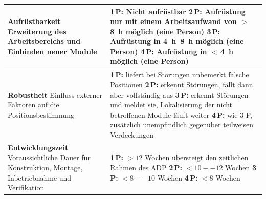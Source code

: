 {\begin{xltabular}{\textwidth}{>{\raggedright\arraybackslash}p{5.4cm}
                              >{\raggedright\arraybackslash}X}
    \midrule
    \textbf{Aufrüstbarkeit}\newline
    Erweiterung des Arbeitsbereichs und Einbinden neuer Module
    & \textbf{1\,P:} Nicht aufrüstbar\newline
      \textbf{2\,P:} Aufrüstung nur mit einem Arbeitsaufwand von $>$\,\SI{8}{\hour} möglich (eine Person)\newline
      \textbf{3\,P:} Aufrüstung in \SIrange{4}{8}{\hour} möglich (eine Person)\newline
      \textbf{4\,P:} Aufrüstung in $<$\,\SI{4}{\hour} möglich (eine Person) \\
    \midrule
    \textbf{Robustheit}\newline
    Einfluss externer Faktoren auf die Positionsbestimmung
    & \textbf{1\,P:} liefert bei Störungen unbemerkt falsche Positionen\newline
      \textbf{2\,P:} erkennt Störungen, fällt dann aber vollständig aus\newline
      \textbf{3\,P:} erkennt Störungen und meldet sie, Lokalisierung der nicht betroffenen Module läuft weiter\newline
      \textbf{4\,P:} wie 3 P, zusätzlich unempfindlich gegenüber teilweisen Verdeckungen \\
    \midrule
    \textbf{Entwicklungszeit}\newline
    Voraussichtliche Dauer für Konstruktion, Montage, Inbetriebnahme und Verifikation
    & \textbf{1\,P:} $>12$ Wochen übersteigt den zeitlichen Rahmen des ADP\newline
      \textbf{2\,P:} $<10--12$ Wochen\newline
      \textbf{3\,P:} $<8--10$ Wochen\newline
      \textbf{4\,P:} $<8$ Wochen \\
\end{xltabular}
}

